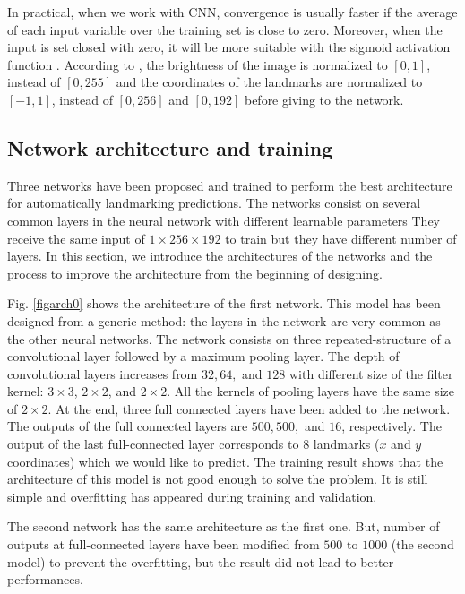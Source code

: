 \documentclass[conference]{IEEEtran}
\begin{document}
In practical, when we work with CNN, convergence is usually faster if the average of each input variable over the training set is close to zero. Moreover, when the input is set closed with zero, it will be more suitable with the sigmoid activation function \cite{lecun2012efficient}. According to \cite{lecun2012efficient}, the brightness of the image is normalized to $[0,1]$, instead of $[0,255]$ and the coordinates of the landmarks are normalized to $[-1,1]$, instead of $[0,256]$ and $[0,192]$ before giving to the network.
\subsection{Network architecture and training}
Three networks have been proposed and trained to perform the best architecture for automatically landmarking predictions. The networks consist on several common layers in the neural network with different learnable parameters They receive the same input of $1 \times 256 \times 192$ to train but they have different number of layers. In this section, we introduce the architectures of the networks and the process to improve the architecture from the beginning of designing.

Fig. \ref{figarch0} shows the architecture of the first network. This model has been designed from a generic method: the layers in the network are very common as the other neural networks. The network consists on three repeated-structure of a convolutional layer followed by a maximum pooling layer. The depth of convolutional layers increases from $32, 64,$ and $128$ with different size of the filter kernel: $3 \times 3$, $2 \times 2$, and $2 \times 2$. All the kernels of pooling layers have the same size of $2 \times 2$.  At the end, three full connected layers have been added to the network. The outputs of the full connected layers are $500, 500,$ and $16$, respectively. The output of the last full-connected layer corresponds to 8 landmarks ($x$ and $y$ coordinates) which we would like to predict. The training result shows that the architecture of this model is not good enough to solve the problem. It is still simple and overfitting has appeared during training and validation. 

The second network has the same architecture as the first one. But, number of outputs at full-connected layers have been modified from $500$ to $1000$ (the second model) to prevent the overfitting, but the result did not lead to better performances. 
\end{document}
